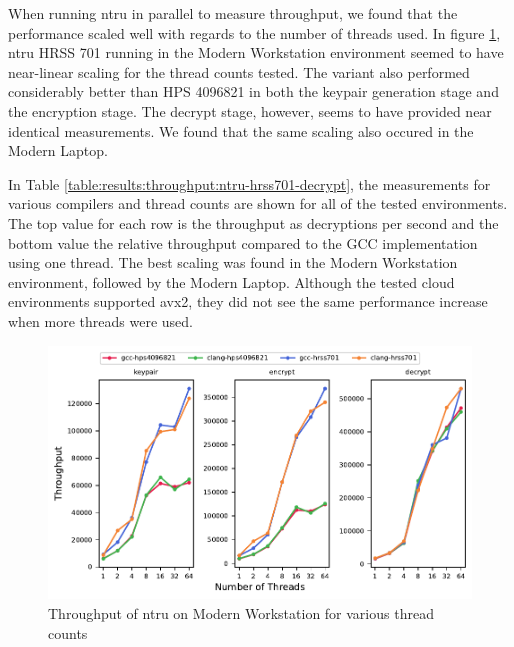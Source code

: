 When running \gls{ntru} in parallel to measure throughput, we found that the performance scaled well with regards to the number of threads used. In figure \ref{figure:results:throughput:ntru-modern-workstation}, \gls{ntru} HRSS 701 running in the Modern Workstation environment seemed to have near-linear scaling for the thread counts tested. The variant also performed considerably better than HPS 4096821 in both the keypair generation stage and the encryption stage. The decrypt stage, however, seems to have provided near identical measurements. We found that the same scaling also occured in the Modern Laptop.

In Table \ref{table:results:throughput:ntru-hrss701-decrypt}, the measurements for various compilers and thread counts are shown for all of the tested environments. The top value for each row is the throughput as decryptions per second and the bottom value the relative throughput compared to the GCC implementation using one thread. The best scaling was found in the Modern Workstation environment, followed by the Modern Laptop. Although the tested cloud environments supported \gls{avx2}, they did not see the same performance increase when more threads were used. %

\newpage

\newpage

\begin{figure}
    \centering
    \includegraphics[scale=0.75]{chapters/results/throughput/Modern Workstation_ntru.pdf}
    \caption{Throughput of \gls{ntru} on Modern Workstation for various thread counts}
    \label{figure:results:throughput:ntru-modern-workstation}
\end{figure}

